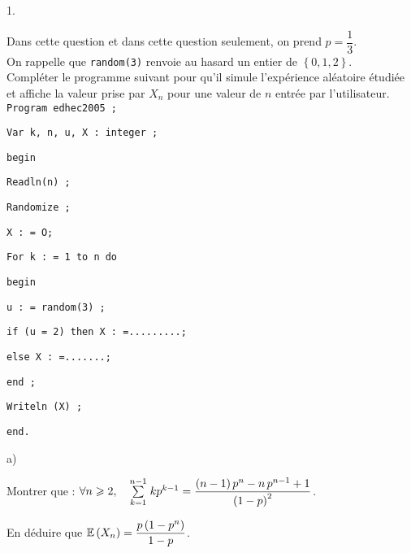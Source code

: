 \documentclass[11pt]{article}%
\begin{document}
\begin{noliste}{1.}
\item Dans cette question et dans cette question seulement, on prend $p
= 
\dfrac{1}{3}$.\\
On rappelle que \texttt{random(3)} renvoie au hasard un entier de
$\left\{
0,1,2\right\} $.\\
Compléter le programme suivant pour qu'il simule l'expérience aléatoire
étudiée et affiche la valeur prise par $X_{n}$ pour une valeur de $n$
entrée par l'utilisateur.\\
\texttt{Program edhec2005 ;}

\texttt{Var k, n, u, X : integer ;}

\texttt{begin}

\texttt{\hspace{1cm}Readln(n) ;}

\texttt{\hspace{1cm}Randomize ; }

\texttt{\hspace{1cm}X : = O;}

\texttt{\hspace{1cm}For k : = 1 to n do }

\texttt{\hspace{1cm}begin}

\texttt{\hspace{2cm}u : = random(3) ;}

\texttt{\hspace{2cm}if (u = 2) then X : =.........;}

\texttt{\hspace{2cm}\hspace{1cm}else X : =.......;}

\texttt{\hspace{2cm}end ;}

\texttt{\hspace{1cm}Writeln (X) ;}

\texttt{end.}

\item 

\begin{noliste}{a)}
 \setlength{\itemsep}{2mm}
\item Montrer que : $\forall n\geqslant 2,\quad
{\textstyle\sum\limits_{k = 1}^{n-1}}\hspace{.1cm}kp^{k-1} = \dfrac{\left( n-1\right) p^{n}-n\,p^{n-1} +
1}{\left( 1-p\right) ^{2}}$.

\item En déduire que $\mathbb{E}\left( X_{n} \right) = \dfrac{p\left(
1-p^{n}\right) }{1-p}$.
\end{noliste}


\end{noliste}
\end{document}
